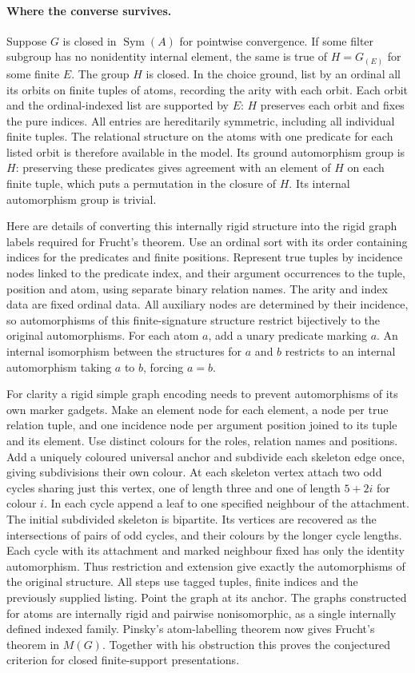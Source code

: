 \documentclass[11pt]{article}
\begin{document}
\paragraph{Where the converse survives.} Suppose $G$ is closed in $\operatorname{Sym}(A)$ for pointwise convergence. If some filter subgroup has no nonidentity internal element, the same is true of $H=G_{(E)}$ for some finite $E$. The group $H$ is closed. In the choice ground, list by an ordinal all its orbits on finite tuples of atoms, recording the arity with each orbit. Each orbit and the ordinal-indexed list are supported by $E$: $H$ preserves each orbit and fixes the pure indices. All entries are hereditarily symmetric, including all individual finite tuples. The relational structure on the atoms with one predicate for each listed orbit is therefore available in the model. Its ground automorphism group is $H$: preserving these predicates gives agreement with an element of $H$ on each finite tuple, which puts a permutation in the closure of $H$. Its internal automorphism group is trivial.

Here are details of converting this internally rigid structure into the rigid graph labels required for Frucht's theorem. Use an ordinal sort with its order containing indices for the predicates and finite positions. Represent true tuples by incidence nodes linked to the predicate index, and their argument occurrences to the tuple, position and atom, using separate binary relation names. The arity and index data are fixed ordinal data. All auxiliary nodes are determined by their incidence, so automorphisms of this finite-signature structure restrict bijectively to the original automorphisms. For each atom $a$, add a unary predicate marking $a$. An internal isomorphism between the structures for $a$ and $b$ restricts to an internal automorphism taking $a$ to $b$, forcing $a=b$.

For clarity a rigid simple graph encoding needs to prevent automorphisms of its own marker gadgets. Make an element node for each element, a node per true relation tuple, and one incidence node per argument position joined to its tuple and its element. Use distinct colours for the roles, relation names and positions. Add a uniquely coloured universal anchor and subdivide each skeleton edge once, giving subdivisions their own colour. At each skeleton vertex attach two odd cycles sharing just this vertex, one of length three and one of length $5+2i$ for colour $i$. In each cycle append a leaf to one specified neighbour of the attachment. The initial subdivided skeleton is bipartite. Its vertices are recovered as the intersections of pairs of odd cycles, and their colours by the longer cycle lengths. Each cycle with its attachment and marked neighbour fixed has only the identity automorphism. Thus restriction and extension give exactly the automorphisms of the original structure. All steps use tagged tuples, finite indices and the previously supplied listing. Point the graph at its anchor. The graphs constructed for atoms are internally rigid and pairwise nonisomorphic, as a single internally defined indexed family. Pinsky's atom-labelling theorem now gives Frucht's theorem in $M(G)$. Together with his obstruction this proves the conjectured criterion for closed finite-support presentations.
\end{document}
